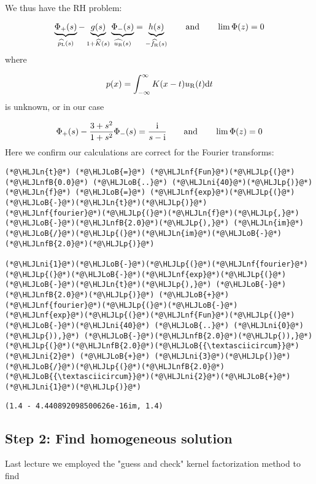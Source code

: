 \documentclass[12pt,landscape]{article}
\newcommand{\HLJLn}[1]{#1}
\newcommand{\HLJLnf}[1]{\textcolor[RGB]{66,102,213}{#1}}
\newcommand{\HLJLnfB}[1]{\textcolor[RGB]{59,151,46}{#1}}
\newcommand{\HLJLni}[1]{\textcolor[RGB]{59,151,46}{#1}}
\newcommand{\HLJLoB}[1]{\textcolor[RGB]{102,102,102}{\textbf{#1}}}
\newcommand{\HLJLp}[1]{#1}
\def\qqand{\qquad\hbox{and}\qquad}
\def\D{ {\rm d} }
\def\I{ {\rm i} }
\def\fR{ f_{\rm R} }
\def\dt{\D t}
\begin{document}
{We thus have the RH problem:

\[
\underbrace{\Phi_+(s)}_{\widehat{p_{\rm L}}(s)} - \underbrace{g(s)}_{1 + \widehat K(s)}
\underbrace{\Phi_-(s)}_{\widehat{u_{\rm R}}(s)} = \underbrace{h(s)}_{-\widehat{\fR}(s)} \qqand \lim\Phi(z) = 0
\]
where

\[
p(x) = \int_{-\infty}^\infty K(x-t)u_{\rm R}(t) \dt
\]
is unknown, or in our case

\[
\Phi_+(s) - {3 + s^2 \over 1 + s^2} \Phi_-(s) = {\I \over s - \I} \qqand \lim\Phi(z) = 0
\]
Here we confirm our calculations are correct for the Fourier transforms:


\begin{lstlisting}
(*@\HLJLn{t}@*) (*@\HLJLoB{=}@*) (*@\HLJLnf{Fun}@*)(*@\HLJLp{(}@*)(*@\HLJLnfB{0.0}@*) (*@\HLJLoB{..}@*) (*@\HLJLni{40}@*)(*@\HLJLp{)}@*)
(*@\HLJLn{f}@*) (*@\HLJLoB{=}@*) (*@\HLJLnf{exp}@*)(*@\HLJLp{(}@*)(*@\HLJLoB{-}@*)(*@\HLJLn{t}@*)(*@\HLJLp{)}@*)
(*@\HLJLnf{fourier}@*)(*@\HLJLp{(}@*)(*@\HLJLn{f}@*)(*@\HLJLp{,}@*) (*@\HLJLoB{-}@*)(*@\HLJLnfB{2.0}@*)(*@\HLJLp{),}@*) (*@\HLJLn{im}@*)(*@\HLJLoB{/}@*)(*@\HLJLp{(}@*)(*@\HLJLn{im}@*)(*@\HLJLoB{-}@*)(*@\HLJLnfB{2.0}@*)(*@\HLJLp{)}@*)

(*@\HLJLni{1}@*)(*@\HLJLoB{-}@*)(*@\HLJLp{(}@*)(*@\HLJLnf{fourier}@*)(*@\HLJLp{(}@*)(*@\HLJLoB{-}@*)(*@\HLJLnf{exp}@*)(*@\HLJLp{(}@*)(*@\HLJLoB{-}@*)(*@\HLJLn{t}@*)(*@\HLJLp{),}@*) (*@\HLJLoB{-}@*)(*@\HLJLnfB{2.0}@*)(*@\HLJLp{)}@*) (*@\HLJLoB{+}@*) (*@\HLJLnf{fourier}@*)(*@\HLJLp{(}@*)(*@\HLJLoB{-}@*)(*@\HLJLnf{exp}@*)(*@\HLJLp{(}@*)(*@\HLJLnf{Fun}@*)(*@\HLJLp{(}@*)(*@\HLJLoB{-}@*)(*@\HLJLni{40}@*) (*@\HLJLoB{..}@*) (*@\HLJLni{0}@*)(*@\HLJLp{)),}@*) (*@\HLJLoB{-}@*)(*@\HLJLnfB{2.0}@*)(*@\HLJLp{)),}@*) (*@\HLJLp{(}@*)(*@\HLJLnfB{2.0}@*)(*@\HLJLoB{{\textasciicircum}}@*)(*@\HLJLni{2}@*) (*@\HLJLoB{+}@*) (*@\HLJLni{3}@*)(*@\HLJLp{)}@*)(*@\HLJLoB{/}@*)(*@\HLJLp{(}@*)(*@\HLJLnfB{2.0}@*)(*@\HLJLoB{{\textasciicircum}}@*)(*@\HLJLni{2}@*)(*@\HLJLoB{+}@*)(*@\HLJLni{1}@*)(*@\HLJLp{)}@*)
\end{lstlisting}

\begin{lstlisting}
(1.4 - 4.440892098500626e-16im, 1.4)
\end{lstlisting}


\subsection{Step 2: Find homogeneous solution}
Last lecture we employed the "guess and check" kernel factorization method to find

}
\end{document}
